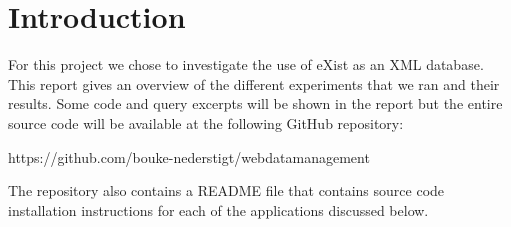 \documentclass[Intro.tex]{subfiles}
\begin{document}
\section{Introduction}
For this project we chose to investigate the use of eXist as an XML database. This report gives an overview of the different experiments that we ran and their results. Some code and query excerpts will be shown in the report but the entire source code will be available at the following GitHub repository:


https://github.com/bouke-nederstigt/webdatamanagement


The repository also contains a README file that contains source code installation instructions for each of the applications discussed below.
\end{document}
